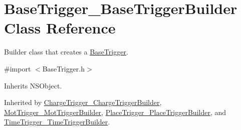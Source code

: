 \hypertarget{interface_base_trigger___base_trigger_builder}{}\section{Base\+Trigger\+\_\+\+Base\+Trigger\+Builder Class Reference}
\label{interface_base_trigger___base_trigger_builder}


Builder class that creates a \hyperlink{interface_base_trigger}{Base\+Trigger}.  




{\ttfamily \#import $<$Base\+Trigger.\+h$>$}



Inherits N\+S\+Object.



Inherited by \hyperlink{interface_charge_trigger___charge_trigger_builder}{Charge\+Trigger\+\_\+\+Charge\+Trigger\+Builder}, \hyperlink{interface_mot_trigger___mot_trigger_builder}{Mot\+Trigger\+\_\+\+Mot\+Trigger\+Builder}, \hyperlink{interface_place_trigger___place_trigger_builder}{Place\+Trigger\+\_\+\+Place\+Trigger\+Builder}, and \hyperlink{interface_time_trigger___time_trigger_builder}{Time\+Trigger\+\_\+\+Time\+Trigger\+Builder}.

